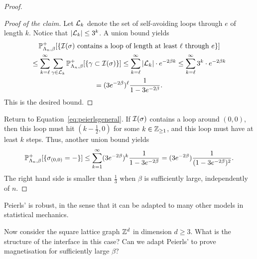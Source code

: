 \begin{proof}
    \begin{proof}[Proof of the claim]
        Let $\calL_k$ denote the set of self-avoiding loops through $e$
        of length $k$.
        Notice that $|\calL_k|\leq 3^k$.
        A union bound yields
        \begin{multline}
            \P_{\Lambda_n,\beta}^+[\{\text{$\calI(\sigma)$ contains a loop of length at least $\ell$ through $e$}\}]
            \\
            \leq
            \sum_{k=\ell}^\infty \sum_{\gamma\in\calL_k} 
            \P_{\Lambda_n,\beta}^+[\{\gamma\subset\calI(\sigma)\}]
            \leq
            \sum_{k=\ell}^\infty |\calL_k|\cdot e^{-2\beta k}
            \leq 
            \sum_{k=\ell}^\infty 3^k\cdot e^{-2\beta k}
            \\
            =
            (3e^{-2\beta})^\ell \frac{1}{1-3e^{-2\beta}}.
        \end{multline}
        This is the desired bound.
    \renewcommand{\qedsymbol}{}
    \end{proof}

    Return to Equation~\eqref{eq:peierlsgeneral}.
    If $\calI(\sigma)$ contains a loop around $(0,0)$, then this loop 
    must hit $(k-\frac12,0)$ for some $k\in\Z_{\geq 1}$,
    and this loop must have at least $k$ steps.
    Thus, another union bound yields
    \[
        \P_{\Lambda_n,\beta}^+[\{\sigma_{(0,0)}=-\}]
        \leq
        \sum_{k=1}^\infty 
        (3e^{-2\beta})^{k} \frac{1}{1-3e^{-2\beta}}
        =(3e^{-2\beta})\frac{1}{(1-3e^{-2\beta})^2}.
    \]
    The right hand side is smaller than $\frac13$ when $\beta$ is sufficiently large,
    independently of $n$.
\end{proof}

\begin{remark*}
    Peierls' is robust,
    in the sense that it can be adapted to many other models in statistical mechanics.
\end{remark*}

\begin{exercise}
    \label{exo:peierls_general}
    Now consider the square lattice graph $\Z^d$ in dimension $d\geq 3$.
    What is the structure of the interface in this case?
    Can we adapt Peierls' to prove magnetisation for sufficiently large $\beta$?
\end{exercise}
